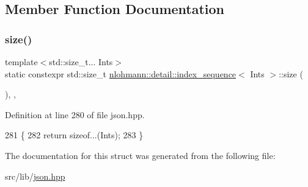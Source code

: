 \subsection{Member Function Documentation}
\mbox{\label{structnlohmann_1_1detail_1_1index__sequence_a7ac529419787d775f52408135304b337}} 
\subsubsection{\texorpdfstring{size()}{size()}}
{\footnotesize\ttfamily template$<$std\+::size\+\_\+t... Ints$>$ \\
static constexpr std\+::size\+\_\+t \hyperlink{structnlohmann_1_1detail_1_1index__sequence}{nlohmann\+::detail\+::index\+\_\+sequence}$<$ Ints $>$\+::size (\begin{DoxyParamCaption}{ }\end{DoxyParamCaption})\hspace{0.3cm}{\ttfamily [inline]}, {\ttfamily [static]}, {\ttfamily [noexcept]}}



Definition at line 280 of file json.\+hpp.


\begin{DoxyCode}
281     \{
282         \textcolor{keywordflow}{return} \textcolor{keyword}{sizeof}...(Ints);
283     \}
\end{DoxyCode}


The documentation for this struct was generated from the following file\+:\begin{DoxyCompactItemize}
\item 
src/lib/\hyperlink{json_8hpp}{json.\+hpp}\end{DoxyCompactItemize}
